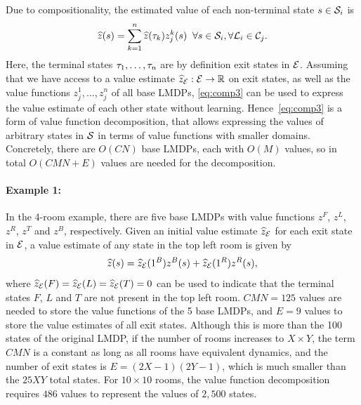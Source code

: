 Due to compositionality, the estimated value of each non-terminal state $s\in\mathcal{S}_i$ is
\begin{align}\label{eq:comp3}
\widehat{z}(s)=\sum_{k=1}^n \widehat{z}(\tau_k) z_j^k(s) \;\; \forall s\in\mathcal{S}_i,\forall\mathcal{L}_i\in\mathcal{C}_j.
\end{align}
Here, the terminal states $\tau_1,\ldots,\tau_n$ are by definition exit states in $\mathcal{E}$. Assuming that we have access to a value estimate $\widehat{z}_{\mathcal{E}}:\mathcal{E}\rightarrow\mathbb{R}$ on exit states, as well as the value functions $z_j^1,\ldots,z_j^n$ of all base LMDPs, \eqref{eq:comp3} can be used to express the value estimate of each other state without learning. Hence~\eqref{eq:comp3} is a form of value function decomposition, that allows expressing the values of arbitrary states in $\mathcal{S}$ in terms of value functions with smaller domains. Concretely, there are $O(CN)$ base LMDPs, each with $O(M)$ values, so in total $O(CMN+E)$ values are needed for the decomposition.

\paragraph{Example 1:} %
In the 4-room example, there are five base LMDPs with value functions $z^F$, $z^L$, $z^R$, $z^T$ and $z^B$, respectively. Given an initial value estimate $\widehat{z}_{\mathcal{E}}$ for each exit state in $\mathcal{E}$, a value estimate of any state in the top left room is given by \[\linebreak\widehat{z}(s)=\widehat{z}_\cE(1^B) z^B(s) + \widehat{z}_\cE(1^R) z^R(s),\] where $\widehat{z}_{\mathcal{E}}(F)=\widehat{z}_{\mathcal{E}}(L)=\widehat{z}_{\mathcal{E}}(T)=0$ can be used to indicate that the terminal states $F$, $L$ and $T$ are not present in the top left room. $CMN = 125$ values are needed to store the value functions of the 5 base LMDPs, and $E=9$ values to store the value estimates of all exit states. Although this is more than the 100 states of the original LMDP, if the number of rooms increases to $X\times Y$, the term $CMN$ is a constant as long as all rooms have equivalent dynamics, and the number of exit states is $E=(2X-1)(2Y-1)$, which is much smaller than the $25 XY$ total states. For $10\times 10$ rooms, the value function decomposition requires $486$ values to represent the values of $2{,}500$ states.\\

